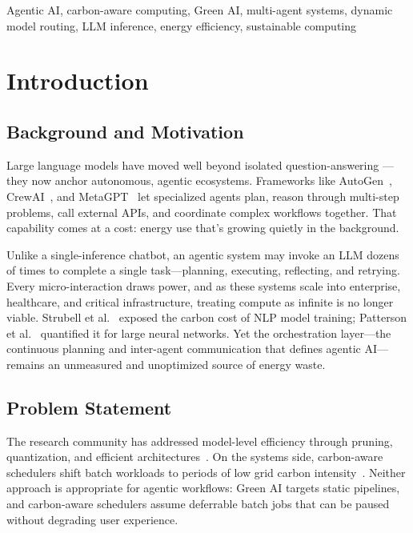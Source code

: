\documentclass[journal]{IEEEtran}
\begin{document}
\begin{IEEEkeywords}
Agentic AI, carbon-aware computing, Green AI, multi-agent systems, dynamic
model routing, LLM inference, energy efficiency, sustainable computing
\end{IEEEkeywords}

\section{Introduction}

\subsection{Background and Motivation}

Large language models have moved well beyond isolated question-answering — they now anchor autonomous, agentic ecosystems. Frameworks like AutoGen~\cite{wu2023autogen}, CrewAI~\cite{moura2023crewai}, and MetaGPT~\cite{hong2024metagpt} let specialized agents plan, reason through multi-step problems, call external APIs, and coordinate complex workflows together. That capability comes at a cost: energy use that's growing quietly in the background.

Unlike a single-inference chatbot, an agentic system may invoke an LLM dozens
of times to complete a single task—planning, executing, reflecting, and
retrying. Every micro-interaction draws power, and as these systems scale into
enterprise, healthcare, and critical infrastructure, treating compute as
infinite is no longer viable. Strubell et al.~\cite{strubell2019energy} exposed
the carbon cost of NLP model training; Patterson et al.~\cite{patterson2021carbon}
quantified it for large neural networks. Yet the orchestration layer—the
continuous planning and inter-agent communication that defines agentic AI—
remains an unmeasured and unoptimized source of energy waste.

\subsection{Problem Statement}

The research community has addressed model-level efficiency through pruning,
quantization, and efficient architectures~\cite{han2016deep,schwartz2020green}.
On the systems side, carbon-aware schedulers shift batch workloads to periods of
low grid carbon intensity~\cite{radovanovic2022carbon,wiesner2021lets}. Neither
approach is appropriate for agentic workflows: Green AI targets static pipelines,
and carbon-aware schedulers assume deferrable batch jobs that can be paused
without degrading user experience.
\end{document}
